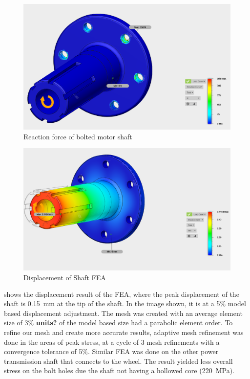 \documentclass[main.tex]{subfiles}
\begin{document}
    \begin{figure}
        \centering
        \includegraphics[width=\linewidth]{images/fig13}
        \caption{Reaction force of bolted motor shaft}
    \end{figure}
    \begin{figure}[H]
        \centering
        \includegraphics[width=\linewidth]{images/fig14}
        \caption{Displacement of Shaft FEA}
        \label{fig:shaft-stress1}
    \end{figure}


 shows the displacement result of the FEA, where the peak displacement of the shaft is \SI{0.15}{mm} at the tip of the shaft. In the image shown, it is at a 5\% model based displacement adjustment. %
The mesh was created with an average element size of 3\% \textbf{units?} of the model based size had a parabolic element order. To refine our mesh and create more accurate results, adaptive mesh refinement was done in the areas of peak stress, at a cycle of 3 mesh refinements with a convergence tolerance of 5\%. Similar FEA was done on the other power transmission shaft that connects to the wheel. The result yielded less overall stress on the bolt holes due the shaft not having a hollowed core (\SI{220}{MPa}).\\
\end{document}
